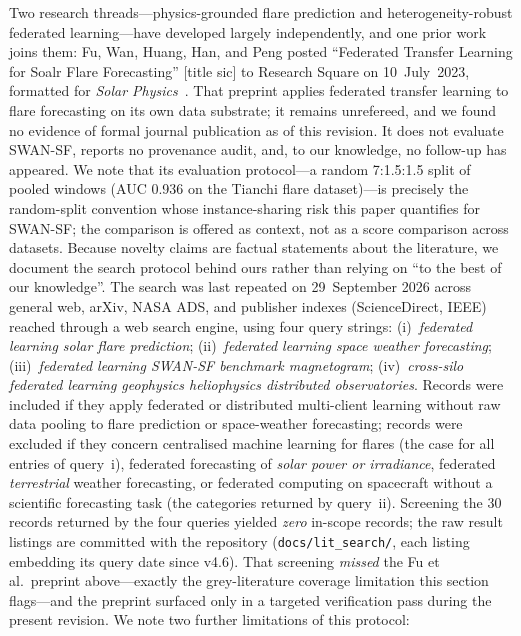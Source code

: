 Two research threads---physics-grounded flare prediction and
heterogeneity-robust federated learning---have developed largely
independently, and one prior work joins them: Fu, Wan, Huang, Han, and
Peng posted ``Federated Transfer Learning for Soalr Flare Forecasting''
[title sic] to Research Square on 10~July~2023, formatted for
\emph{Solar Physics}~\cite{fu2023}. That preprint applies federated
transfer learning to flare forecasting on its own data substrate; it
remains unrefereed, and we found no evidence of formal journal
publication as of this revision. It does not evaluate SWAN-SF, reports
no provenance audit, and, to our knowledge, no follow-up has appeared.
We note that its evaluation protocol---a random 7:1.5:1.5 split of
pooled windows (AUC 0.936 on the Tianchi flare dataset)---is precisely
the random-split convention whose instance-sharing risk this paper
quantifies for SWAN-SF; the comparison is offered as context, not as a
score comparison across datasets.
Because novelty claims are factual statements about the literature, we
document the search protocol behind ours rather than relying on ``to
the best of our knowledge''. The search was last
repeated on 29~September 2026 across general web, arXiv, NASA ADS,
and publisher indexes (ScienceDirect, IEEE) reached through a web
search engine, using four query strings: (i)~\emph{federated learning
solar flare prediction}; (ii)~\emph{federated learning space weather
forecasting}; (iii)~\emph{federated learning SWAN-SF benchmark
magnetogram}; (iv)~\emph{cross-silo federated learning geophysics
heliophysics distributed observatories}. Records were included if
they apply federated or distributed multi-client learning without raw
data pooling to flare prediction or space-weather forecasting; records
were excluded if they concern centralised machine learning for flares
(the case for all entries of query~i), federated forecasting of
\emph{solar power or irradiance}, federated \emph{terrestrial}
weather forecasting, or federated computing on spacecraft without a
scientific forecasting task (the categories returned by query~ii).
Screening the 30 records returned by the four queries yielded
\emph{zero} in-scope records; the raw result listings are committed
with the repository (\texttt{docs/lit\_search/}, each listing
embedding its query date since v4.6). That screening
\emph{missed} the Fu et al.\ preprint above---exactly the
grey-literature coverage limitation this section flags---and the
preprint surfaced only in a targeted verification pass during the
present revision. We note two further limitations of this protocol:
